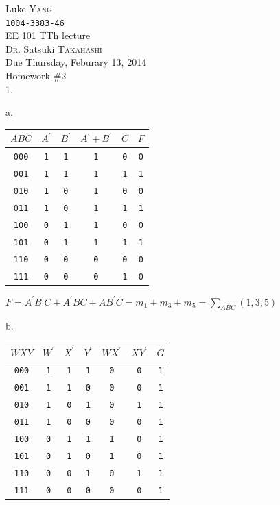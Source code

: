 \documentclass[UTF8,12pt,letterpaper,oneside]{amsart}
\begin{document}
\noindent Luke \textsc{Yang}\\
\texttt{1004-3383-46}\\
EE 101 TTh lecture\\
\textsc{Dr.} Satsuki \textsc{Takahashi}\\
Due Thursday, Feburary 13, 2014\\
Homework \#2\\

1.

a. 

\begin{tabular}{c|ccccc}
$ABC$ & $A^\prime$ & $B^\prime$ & $A^\prime + B^\prime$ & $C$ & $F$\\\hline
\texttt{000} & \texttt{1} & \texttt{1} & \texttt{1} & \texttt{0} & \texttt{0}\\\hline
\texttt{001} & \texttt{1} & \texttt{1} & \texttt{1} & \texttt{1} & \texttt{1}\\\hline
\texttt{010} & \texttt{1} & \texttt{0} & \texttt{1} & \texttt{0} & \texttt{0}\\\hline
\texttt{011} & \texttt{1} & \texttt{0} & \texttt{1} & \texttt{1} & \texttt{1}\\\hline
\texttt{100} & \texttt{0} & \texttt{1} & \texttt{1} & \texttt{0} & \texttt{0}\\\hline
\texttt{101} & \texttt{0} & \texttt{1} & \texttt{1} & \texttt{1} & \texttt{1}\\\hline
\texttt{110} & \texttt{0} & \texttt{0} & \texttt{0} & \texttt{0} & \texttt{0}\\\hline
\texttt{111} & \texttt{0} & \texttt{0} & \texttt{0} & \texttt{1} & \texttt{0}\\\hline
\end{tabular}

$F = A^\prime B^\prime C + A^\prime BC + AB^\prime C = m_1 + m_3 + m_5 = \sum_{ABC}(1, 3, 5)$

b.

\begin{tabular}{c|cccccc}
$WXY$ & $W^\prime$ & $X^\prime$ & $Y^\prime$ & $WX^\prime$ & $XY^\prime$ & $G$\\\hline
\texttt{000} & \texttt{1} & \texttt{1} & \texttt{1} & \texttt{0} & \texttt{0} & \texttt{1}\\\hline
\texttt{001} & \texttt{1} & \texttt{1} & \texttt{0} & \texttt{0} & \texttt{0} & \texttt{1}\\\hline
\texttt{010} & \texttt{1} & \texttt{0} & \texttt{1} & \texttt{0} & \texttt{1} & \texttt{1}\\\hline
\texttt{011} & \texttt{1} & \texttt{0} & \texttt{0} & \texttt{0} & \texttt{0} & \texttt{1}\\\hline
\texttt{100} & \texttt{0} & \texttt{1} & \texttt{1} & \texttt{1} & \texttt{0} & \texttt{1}\\\hline
\texttt{101} & \texttt{0} & \texttt{1} & \texttt{0} & \texttt{1} & \texttt{0} & \texttt{1}\\\hline
\texttt{110} & \texttt{0} & \texttt{0} & \texttt{1} & \texttt{0} & \texttt{1} & \texttt{1}\\\hline
\texttt{111} & \texttt{0} & \texttt{0} & \texttt{0} & \texttt{0} & \texttt{0} & \texttt{1}\\\hline
\end{tabular}
\end{document}
